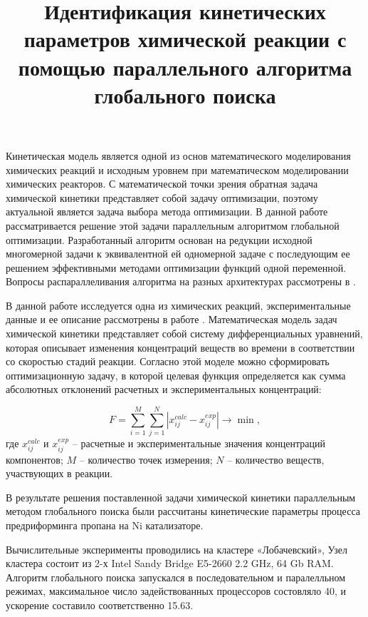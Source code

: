 \documentclass[11pt, oneside, a4paper]{article}
\begin{document}

\title{Идентификация кинетических параметров химической реакции с помощью параллельного алгоритма глобального поиска }


Кинетическая модель является одной из основ математического моделирования химических реакций и исходным уровнем при математическом моделировании химических реакторов. С математической точки зрения обратная задача химической кинетики представляет собой задачу оптимизации, поэтому актуальной является задача выбора метода оптимизации.  В данной работе рассматривается решение этой задачи параллельным алгоритмом глобальной оптимизации.  Разработанный алгоритм основан на редукции исходной многомерной задачи к эквивалентной ей одномерной задаче с последующим ее решением эффективными методами оптимизации функций одной переменной. Вопросы распараллеливания алгоритма на разных архитектурах рассмотрены в \cite{Strongin13, Barkalov2016}. 

В данной работе исследуется одна из химических реакций, экспериментальные данные и ее описание рассмотрены в работе \cite {Uskov2020}. Математическая модель задач химической кинетики представляет собой систему дифференциальных уравнений, которая описывает изменения концентраций веществ во времени в соответствии со скоростью стадий реакции. Согласно этой моделе можно сформировать оптимизационную задачу, в которой целевая функция определяется как сумма абсолютных отклонений расчетных и экспериментальных концентраций:

\begin{displaymath}\label{func}
F = \sum\limits_{i=1}^M \sum\limits_{j=1}^N \left| x_{ij}^{calc} - x_{ij}^{exp} \right| \rightarrow \min,
\end{displaymath}
где $ x_ {ij} ^ {calc} $ и $ x_ {ij} ^ {exp} $ -- расчетные и экспериментальные значения концентраций компонентов; $ M $ -- количество точек измерения; $ N $ -- количество веществ, участвующих в реакции.


В результате решения поставленной задачи химической кинетики параллельным методом глобального поиска были рассчитаны кинетические параметры процесса предриформинга пропана на Ni катализаторе.

Вычислительные эксперименты проводились на кластере «Лобачевский», Узел кластера состоит из 2-х Intel Sandy Bridge E5-2660 2.2 GHz, 64 Gb RAM. Алгоритм глобального поиска запускался в последовательном и паралелльном режимах, максимальное число задействованных процессоров состовляло 40, и ускорение составило соответственно 15.63.
\end{document}
